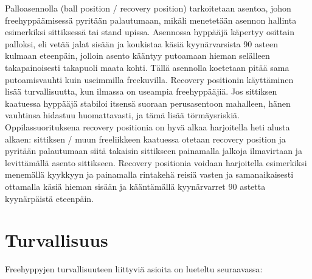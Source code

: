 Palloasennolla (ball position / recovery position) tarkoitetaan asentoa, johon freehyppäämisessä pyritään palautumaan, mikäli menetetään asennon hallinta esimerkiksi sittiksessä tai stand upissa. Asennossa hyppääjä käpertyy osittain palloksi, eli vetää jalat sisään ja koukistaa käsiä kyynärvarsista 90 asteen kulmaan eteenpäin, jolloin asento kääntyy putoamaan hieman selälleen takapainoisesti takapuoli maata kohti. Tällä asennolla koetetaan pitää sama putoamisvauhti kuin useimmilla freekuvilla. Recovery positionin käyttäminen lisää turvallisuutta, kun ilmassa on useampia freehyppääjiä. Jos sittiksen kaatuessa hyppääjä stabiloi itsensä suoraan perusasentoon mahalleen, hänen vauhtinsa hidastuu huomattavasti, ja tämä lisää törmäysriskiä. Oppilassuorituksena recovery positionia on hyvä alkaa harjoitella heti alusta alkaen: sittiksen / muun freeliikkeen kaatuessa otetaan recovery position ja pyritään palautumaan siitä takaisin sittikseen painamalla jalkoja ilmavirtaan ja levittämällä asento sittikseen. Recovery positionia voidaan harjoitella esimerkiksi menemällä kyykkyyn ja painamalla rintakehä reisiä vasten ja samanaikaisesti ottamalla käsiä hieman sisään ja kääntämällä kyynärvarret 90 astetta kyynärpäistä eteenpäin. 

\section{ Turvallisuus }
\label{free-hyppaaminen-turvallisuus}


Freehyppyjen turvallisuuteen liittyviä asioita on lueteltu seuraavassa: 

